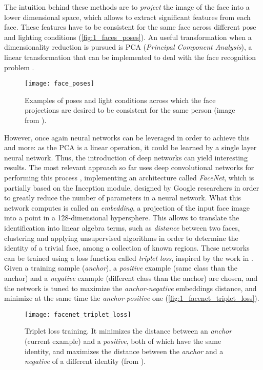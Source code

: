 The intuition behind these methods are to \textit{project} the image of the face into a lower dimensional space, which allows to extract significant features from each face. These features have to be consistent for the same face across different pose and lighting conditions (\autoref{fig:1_faces_poses}). An useful transformation when a dimensionality reduction is pursued is PCA (\textit{Principal Component Analysis}), a linear transformation that can be implemented to deal with the face recognition problem \cite{face_pca}.

\begin{figure}[h]
	\centering
	\texttt{[image: face\_poses]}
	\caption{Examples of poses and light conditions across which the face projections are desired to be consistent for the same person (image from \cite{facenet}).}
	\label{fig:1_faces_poses}
\end{figure}


However, once again neural networks can be leveraged in order to achieve this and more: as the PCA is a linear operation, it could be learned by a single layer neural network. Thus, the introduction of deep networks can yield interesting results. The most relevant approach so far uses deep convolutional networks for performing this process \cite{facenet}, implementing an architecture called \textit{FaceNet}, which is partially based on the Inception \cite{inception} module, designed by Google researchers in order to greatly reduce the number of parameters in a neural network. What this network computes is called an \textit{embedding}, a projection of the input face image into a point in a 128-dimensional hypersphere. This allows to translate the identification into linear algebra terms, such as \textit{distance} between two faces, clustering and applying unsupervised algorithms in order to determine the identity of a trivial face, among a collection of known regions. These networks can be trained using a loss function  called \textit{triplet loss}, inspired by the work in \cite{lmnn_loss}. Given a training sample (\textit{anchor}), a \textit{positive} example (same class than the anchor) and a \textit{negative} example (different class than the anchor) are chosen, and the network is tuned to maximize the \textit{anchor-negative} embeddings distance, and minimize at the same time the \textit{anchor-positive} one (\autoref{fig:1_facenet_triplet_loss}).

\begin{figure}[h]
	\centering
	\texttt{[image: facenet\_triplet\_loss]}
	\caption{Triplet loss training. It minimizes the distance between an \emph{anchor} (current example) and a \emph{positive}, both of which have the same identity, and maximizes the distance between the \emph{anchor} and a \emph{negative} of a different identity (from \cite{facenet}).}
	\label{fig:1_facenet_triplet_loss}
\end{figure}


